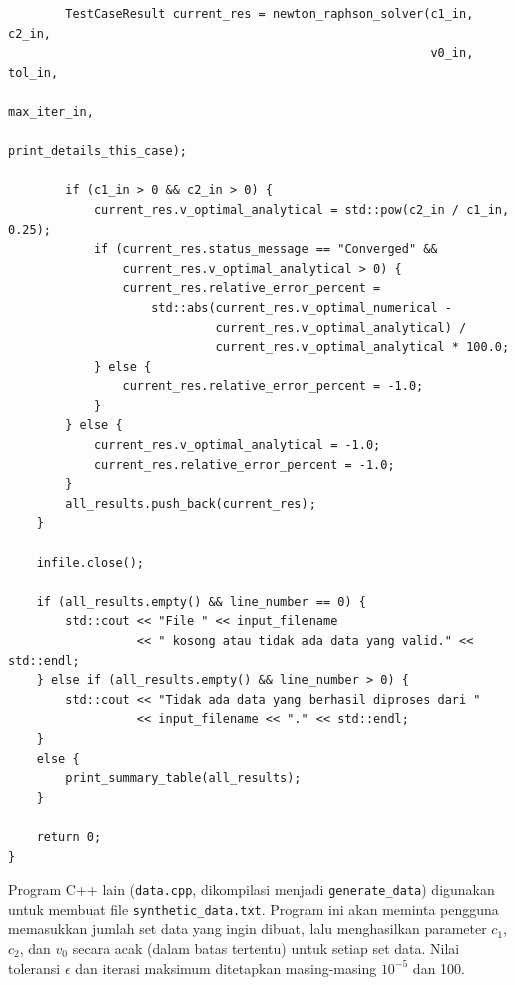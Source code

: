 \documentclass[conference]{IEEEtran}
\begin{document}
\begin{verbatim}
        TestCaseResult current_res = newton_raphson_solver(c1_in, c2_in, 
                                                           v0_in, tol_in, 
                                                           max_iter_in, 
                                                           print_details_this_case);

        if (c1_in > 0 && c2_in > 0) {
            current_res.v_optimal_analytical = std::pow(c2_in / c1_in, 0.25);
            if (current_res.status_message == "Converged" && 
                current_res.v_optimal_analytical > 0) {
                current_res.relative_error_percent = 
                    std::abs(current_res.v_optimal_numerical - 
                             current_res.v_optimal_analytical) / 
                             current_res.v_optimal_analytical * 100.0;
            } else {
                current_res.relative_error_percent = -1.0; 
            }
        } else {
            current_res.v_optimal_analytical = -1.0; 
            current_res.relative_error_percent = -1.0;
        }
        all_results.push_back(current_res);
    }

    infile.close();

    if (all_results.empty() && line_number == 0) {
        std::cout << "File " << input_filename 
                  << " kosong atau tidak ada data yang valid." << std::endl;
    } else if (all_results.empty() && line_number > 0) {
        std::cout << "Tidak ada data yang berhasil diproses dari " 
                  << input_filename << "." << std::endl;
    }
    else {
        print_summary_table(all_results);
    }

    return 0;
}
\end{verbatim}
\endgroup
Program C++ lain (\texttt{data.cpp}, dikompilasi menjadi \texttt{generate\_data}) digunakan untuk membuat file \texttt{synthetic\_data.txt}. Program ini akan meminta pengguna memasukkan jumlah set data yang ingin dibuat, lalu menghasilkan parameter $c_1$, $c_2$, dan $v_0$ secara acak (dalam batas tertentu) untuk setiap set data. Nilai toleransi $\epsilon$ dan iterasi maksimum ditetapkan masing-masing $10^{-5}$ dan 100.
\vspace{-0.4cm} %
\end{document}
